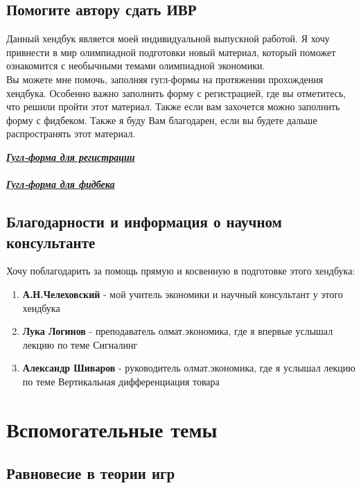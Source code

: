 \section{Помогите автору сдать ИВР}
\indent\setlength{\parindent}{1em}Данный хендбук является моей индивидуальной выпускной работой. Я хочу привнести в мир олимпиадной подготовки новый материал, который поможет ознакомится с необычными темами олимпиадной экономики.\smallskip\\
\indent\setlength{\parindent}{1em}Вы можете мне помочь, заполняя гугл-формы на протяжении прохождения хендбука. Особенно важно заполнить форму с регистрацией, где вы отметитесь, что решили пройти этот материал. Также если вам захочется можно заполнить форму с фидбеком. Также я буду Вам благодарен, если вы будете дальше распространять этот материал.\smallskip\\
\begin{center}
    \textbf{\textit{\href{https://forms.gle/bW7CD2zcdUhnbFnR7}{Гугл-форма для регистрации}}}\\\smallskip\\
    \textbf{\textit{\href{https://forms.gle/31gene8PMRuqCLvr9}{Гугл-форма для фидбека}}}
\end{center}

\section{Благодарности и информация о научном консультанте}
\indent\setlength{\parindent}{1em}Хочу поблагодарить за помощь прямую и косвенную в подготовке этого хендбука:
\begin{enumerate}
    \item \textbf{А.Н.Челеховский} - мой учитель экономики и научный консультант у этого хендбука
    \item \textbf{Лука Логинов} - преподаватель олмат.экономика, где я впервые услышал лекцию по теме Сигналинг
    \item \textbf{Александр Шиваров} - руководитель олмат.экономика, где я услышал лекцию по теме Вертикальная дифференциация товара
\end{enumerate}



\chapter{Вспомогательные темы}


\section{Равновесие в теории игр}

